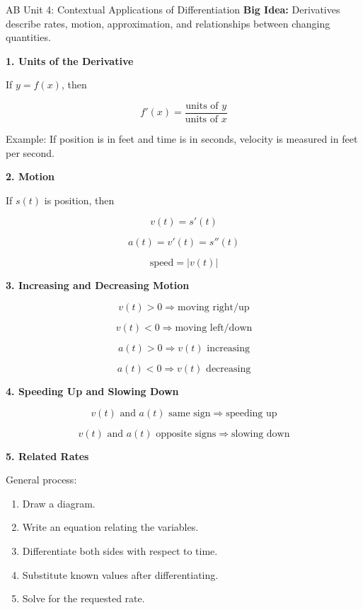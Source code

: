 \documentclass[11pt]{article}
\newcommand{\subtopic}[1]{
\vspace{0.45em}
\textcolor{novelPurpleDark}{\textbf{#1}}
}
\begin{document}
\newpage

\begin{unitbox}{AB Unit 4: Contextual Applications of Differentiation}
\textbf{Big Idea:} Derivatives describe rates, motion, approximation, and relationships between changing quantities.
\end{unitbox}

\subtopic{1. Units of the Derivative}

If \(y=f(x)\), then

\[
f'(x)=\frac{\text{units of }y}{\text{units of }x}
\]

Example: If position is in feet and time is in seconds, velocity is measured in feet per second.

\subtopic{2. Motion}

If \(s(t)\) is position, then

\[
v(t)=s'(t)
\]

\[
a(t)=v'(t)=s''(t)
\]

\[
\text{speed}=|v(t)|
\]

\subtopic{3. Increasing and Decreasing Motion}

\[
v(t)>0 \Rightarrow \text{moving right/up}
\]

\[
v(t)<0 \Rightarrow \text{moving left/down}
\]

\[
a(t)>0 \Rightarrow v(t)\text{ increasing}
\]

\[
a(t)<0 \Rightarrow v(t)\text{ decreasing}
\]

\subtopic{4. Speeding Up and Slowing Down}

\[
v(t)\text{ and }a(t)\text{ same sign} \Rightarrow \text{speeding up}
\]

\[
v(t)\text{ and }a(t)\text{ opposite signs} \Rightarrow \text{slowing down}
\]

\subtopic{5. Related Rates}

General process:

\begin{enumerate}[leftmargin=1.5em]
\item Draw a diagram.
\item Write an equation relating the variables.
\item Differentiate both sides with respect to time.
\item Substitute known values after differentiating.
\item Solve for the requested rate.
\end{enumerate}
\end{document}
